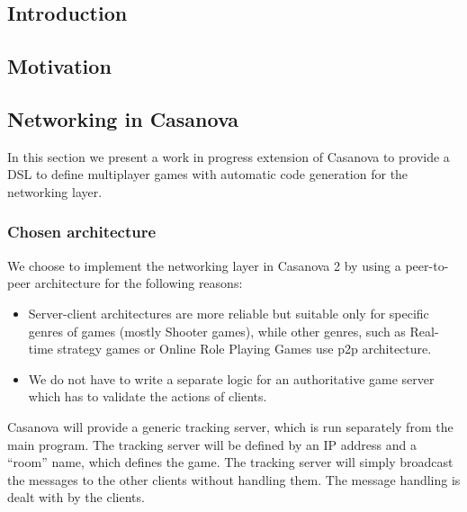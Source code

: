 \subsection*{Introduction}

\subsection*{Motivation}

\subsection*{Networking in Casanova}
In this section we present a work in progress extension of Casanova to provide a DSL to define multiplayer games with automatic code generation for the networking layer.

\subsubsection{Chosen architecture}
We choose to implement the networking layer in Casanova 2 by using a peer-to-peer architecture for the following reasons:

\begin{itemize}
	\item Server-client architectures are more reliable but suitable only for specific genres of games (mostly Shooter games), while other genres, such as Real-time strategy games or Online Role Playing Games use p2p architecture.
	\item We do not have to write a separate logic for an authoritative game server which has to validate the actions of clients.
\end{itemize}

Casanova will provide a generic tracking server, which is run separately from the main program. The tracking server will be defined by an IP address and a ``room'' name, which defines the game. The tracking server will simply broadcast the messages to the other clients without handling them. The message handling is dealt with by the clients.


